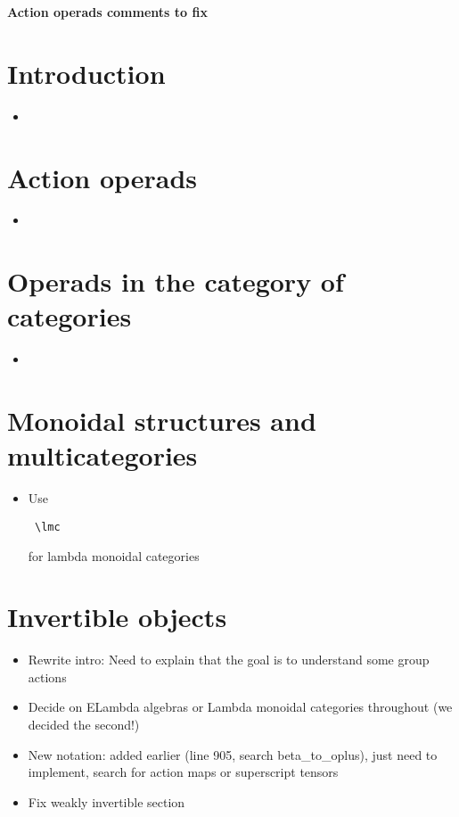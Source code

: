 \documentclass{amsart}
\begin{document}
\begin{center}
\begin{Large}
\textbf{Action operads comments to fix}
\end{Large}
\end{center}
\vskip1cm

\section{ Introduction}
\begin{itemize}
\item

\end{itemize}
\section{ Action operads}
\begin{itemize}
\item

\end{itemize}

\section{Operads in the category of categories}
\begin{itemize}
\item

\end{itemize}

\section{ Monoidal structures and multicategories}

\begin{itemize}
\item Use \begin{verbatim} \lmc \end{verbatim} for lambda monoidal categories
\end{itemize}



\section{ Invertible objects}

\begin{itemize}
\item Rewrite intro: Need to explain that the goal is to understand some group actions
\item Decide on ELambda algebras or Lambda monoidal categories throughout (we decided the second!)
\item New notation: added earlier (line 905, search beta\_to\_oplus), just need to implement, search for action maps or superscript tensors
\item Fix weakly invertible section
\end{itemize}
\end{document}
